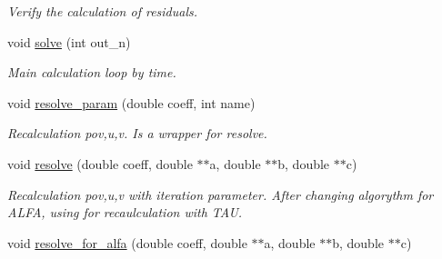 \begin{DoxyCompactItemize}
\begin{DoxyCompactList}\small\item\em Verify the calculation of residuals. \end{DoxyCompactList}\item 
void \hyperlink{classAlg_ad75df7e9510a1d765fdac3ab774144fb}{solve} (int out\_\-n)
\begin{DoxyCompactList}\small\item\em Main calculation loop by time. \end{DoxyCompactList}\item 
void \hyperlink{classAlg_a174f9ae3ac37adc830bf47b1829e2ddb}{resolve\_\-param} (double coeff, int name)
\begin{DoxyCompactList}\small\item\em Recalculation pov,u,v. Is a wrapper for resolve. \end{DoxyCompactList}\item 
void \hyperlink{classAlg_ad9daf68e4d275edab2d143b1fe9bf2e9}{resolve} (double coeff, double $\ast$$\ast$a, double $\ast$$\ast$b, double $\ast$$\ast$c)
\begin{DoxyCompactList}\small\item\em Recalculation pov,u,v with iteration parameter. After changing algorythm for ALFA, using for recaulculation with TAU. \end{DoxyCompactList}\item 
\hypertarget{classAlg_a693eaa5ee0a954e3907b0a3141b63925}{
void \hyperlink{classAlg_a693eaa5ee0a954e3907b0a3141b63925}{resolve\_\-for\_\-alfa} (double coeff, double $\ast$$\ast$a, double $\ast$$\ast$b, double $\ast$$\ast$c)}
\label{classAlg_a693eaa5ee0a954e3907b0a3141b63925}


\end{DoxyCompactItemize}
